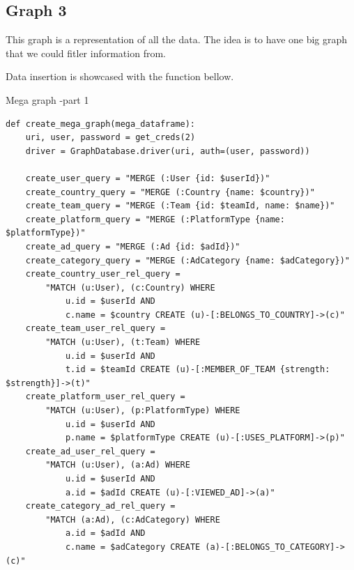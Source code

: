 \subsection{Graph 3}\label{Graph3}

This graph is a representation of all the data. The idea is to have one big graph that we could fitler information from.

Data insertion is showcased with the function bellow.
\begin{listing}[H]
\caption{Mega graph -part 1}
\begin{verbatim}
def create_mega_graph(mega_dataframe):
    uri, user, password = get_creds(2)
    driver = GraphDatabase.driver(uri, auth=(user, password))

    create_user_query = "MERGE (:User {id: $userId})"
    create_country_query = "MERGE (:Country {name: $country})"
    create_team_query = "MERGE (:Team {id: $teamId, name: $name})"
    create_platform_query = "MERGE (:PlatformType {name: $platformType})"
    create_ad_query = "MERGE (:Ad {id: $adId})"
    create_category_query = "MERGE (:AdCategory {name: $adCategory})"
    create_country_user_rel_query = 
        "MATCH (u:User), (c:Country) WHERE 
            u.id = $userId AND 
            c.name = $country CREATE (u)-[:BELONGS_TO_COUNTRY]->(c)"
    create_team_user_rel_query = 
        "MATCH (u:User), (t:Team) WHERE 
            u.id = $userId AND 
            t.id = $teamId CREATE (u)-[:MEMBER_OF_TEAM {strength: $strength}]->(t)"
    create_platform_user_rel_query = 
        "MATCH (u:User), (p:PlatformType) WHERE 
            u.id = $userId AND 
            p.name = $platformType CREATE (u)-[:USES_PLATFORM]->(p)"
    create_ad_user_rel_query = 
        "MATCH (u:User), (a:Ad) WHERE 
            u.id = $userId AND 
            a.id = $adId CREATE (u)-[:VIEWED_AD]->(a)"
    create_category_ad_rel_query = 
        "MATCH (a:Ad), (c:AdCategory) WHERE 
            a.id = $adId AND 
            c.name = $adCategory CREATE (a)-[:BELONGS_TO_CATEGORY]->(c)"
\end{verbatim}
\end{listing}

